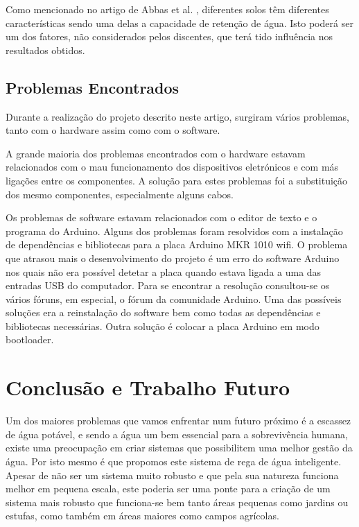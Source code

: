 \documentclass[conference]{IEEEtran}
\begin{document}
Como mencionado no artigo de Abbas et al. \cite{abbas2014smart}, diferentes solos têm diferentes características
sendo uma delas a capacidade de retenção de água. Isto poderá ser um dos fatores, não considerados pelos
discentes, que terá tido influência nos resultados obtidos.

\subsection{Problemas Encontrados}

Durante a realização do projeto descrito neste artigo, surgiram vários problemas, tanto com o hardware
assim como com o software.

A grande maioria dos problemas encontrados com o hardware estavam relacionados com o mau funcionamento dos
dispositivos eletrónicos e com más ligações entre os componentes. A solução para estes problemas foi a
substituição dos mesmo componentes, especialmente alguns cabos.

Os problemas de software estavam relacionados com o editor de texto e o programa do Arduino. Alguns dos problemas
foram resolvidos com a instalação de dependências e bibliotecas para a placa Arduino MKR 1010 wifi.
O problema que atrasou mais o desenvolvimento do projeto é um erro do software Arduino nos quais não era possível
detetar a placa quando estava ligada a uma das entradas USB do computador. Para se encontrar a resolução
consultou-se os vários fóruns, em especial, o fórum da comunidade Arduino. Uma das possíveis soluções era a
reinstalação do software bem como todas as dependências e bibliotecas necessárias. Outra solução é colocar a
placa Arduino em modo bootloader. \cite{arduinoport}

\section{Conclusão e Trabalho Futuro}

Um dos maiores problemas que vamos enfrentar num futuro próximo é a escassez de água potável,
e sendo a água um bem essencial para a sobrevivência humana, existe uma preocupação
em criar sistemas que possibilitem uma melhor gestão da água. Por isto mesmo
é que propomos este sistema de rega de água inteligente. Apesar de não ser um
sistema muito robusto e que pela sua natureza funciona melhor em pequena escala, este
poderia ser uma ponte para a criação de um sistema mais robusto que funciona-se bem
tanto áreas pequenas como jardins ou estufas, como também em áreas maiores como campos agrícolas.
\end{document}
